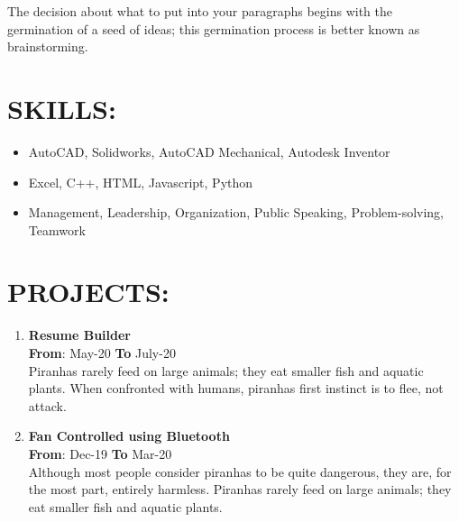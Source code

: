 \documentclass{article}
\begin{document}
\begin{multicols}{2}
\begin{flushleft}
The decision about what to put into your paragraphs begins with the germination of a seed of ideas; this germination process is better known as brainstorming. 
\end{flushleft}

\vspace{3pt}
\section*{\large{\uppercase{Skills:}}}

\begin{flushleft}
\begin{itemize}[noitemsep,nolistsep]
	\item AutoCAD, Solidworks, AutoCAD Mechanical, Autodesk Inventor
	\item Excel, C++, HTML, Javascript, Python
	\item Management, Leadership, Organization, Public Speaking, Problem-solving, Teamwork
\end{itemize}
\end{flushleft}
\vspace{5pt}



\section*{\large{\uppercase{projects:}}}


\begin{enumerate}
	\item {\textbf{Resume Builder}}\\
	\hfill {\textbf{From}}: May-20 {\textbf{To}} July-20\\
	Piranhas rarely feed on large animals; they eat smaller fish and aquatic plants. When confronted with humans, piranhas first instinct is to flee, not attack. 
	\item {\textbf{Fan Controlled using Bluetooth}}\\
	\hfill {\textbf{From}}: Dec-19 {\textbf{To}} Mar-20\\
	Although most people consider piranhas to be quite dangerous, they are, for the most part, entirely harmless. Piranhas rarely feed on large animals; they eat smaller fish and aquatic plants.
\end{enumerate}


\end{multicols}
\end{document}
